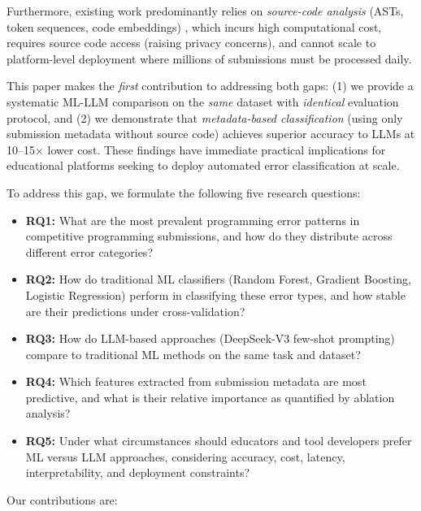 \documentclass[10pt,a4paper]{article}
\begin{document}
Furthermore, existing work predominantly relies on \textit{source-code
analysis} (ASTs, token sequences, code embeddings)
\cite{wang2017learning,feng2020codebert}, which incurs high
computational cost, requires source code access (raising privacy concerns),
and cannot scale to platform-level deployment where millions of submissions
must be processed daily.

This paper makes the \textit{first} contribution to addressing both gaps:
(1) we provide a systematic ML-LLM comparison on the \textit{same} dataset
with \textit{identical} evaluation protocol, and (2) we demonstrate that
\textit{metadata-based classification} (using only submission metadata without
source code) achieves superior accuracy to LLMs at 10--15$\times$ lower cost.
These findings have immediate practical implications for educational platforms
seeking to deploy automated error classification at scale.

To address this gap, we formulate the following five research questions:

\begin{itemize}
    \item \textbf{RQ1:} What are the most prevalent programming error patterns
          in competitive programming submissions, and how do they distribute
          across different error categories?
    \item \textbf{RQ2:} How do traditional ML classifiers (Random Forest,
          Gradient Boosting, Logistic Regression) perform in classifying these
          error types, and how stable are their predictions under cross-validation?
    \item \textbf{RQ3:} How do LLM-based approaches (DeepSeek-V3
          few-shot prompting) compare to traditional ML methods on the same task and dataset?
    \item \textbf{RQ4:} Which features extracted from submission metadata are
          most predictive, and what is their relative importance as quantified
          by ablation analysis?
    \item \textbf{RQ5:} Under what circumstances should educators and tool
          developers prefer ML versus LLM approaches, considering accuracy,
          cost, latency, interpretability, and deployment constraints?
\end{itemize}

Our contributions are:
\end{document}
